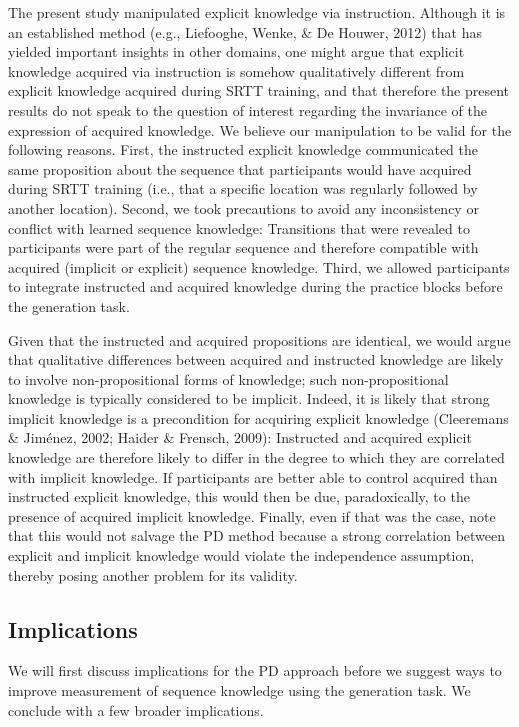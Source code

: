 \documentclass[english,,man]{apa6}
\begin{document}
The present study manipulated explicit knowledge via instruction.
Although it is an established method (e.g., Liefooghe, Wenke, \& De Houwer, 2012) that has yielded important insights in other domains,
one might argue that explicit knowledge acquired via instruction is somehow qualitatively different from explicit knowledge acquired during SRTT training, and that therefore the present results do not speak to the question of interest regarding the invariance of the expression of acquired knowledge.
We believe our manipulation to be valid for the following reasons.
First, the instructed explicit knowledge communicated the same proposition about the sequence that participants would have acquired during SRTT training (i.e., that a specific location was regularly followed by another location).
Second, we took precautions to avoid any inconsistency or conflict with learned sequence knowledge:
Transitions that were revealed to participants were part of the regular sequence and therefore compatible with acquired (implicit or explicit) sequence knowledge.
Third, we allowed participants to integrate instructed and acquired knowledge during the practice blocks before the generation task.

Given that the instructed and acquired propositions are identical, we would argue that qualitative differences between acquired and instructed knowledge are likely to involve non-propositional forms of knowledge; such non-propositional knowledge is typically considered to be implicit.
Indeed, it is likely that strong implicit knowledge is a precondition for acquiring explicit knowledge (Cleeremans \& Jiménez, 2002; Haider \& Frensch, 2009):
Instructed and acquired explicit knowledge are therefore likely to differ in the degree to which they are correlated with implicit knowledge.
If participants are better able to control acquired than instructed explicit knowledge, this would then be due, paradoxically, to the presence of acquired implicit knowledge.
Finally, even if that was the case, note that this would not salvage the PD method because a strong correlation between explicit and implicit knowledge would violate the independence assumption, thereby posing another problem for its validity.

\hypertarget{implications}{%
\subsection{Implications}\label{implications}}

We will first discuss implications for the PD approach before we suggest ways to improve measurement of sequence knowledge using the generation task.
We conclude with a few broader implications.
\end{document}
